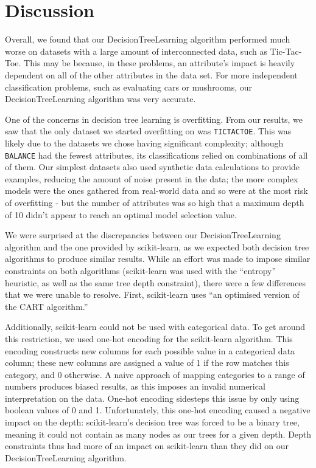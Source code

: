 \documentclass[screen, authorversion, nonacm, sigconf]{acmart}
\begin{document}
\section{Discussion}

Overall, we found that our DecisionTreeLearning algorithm performed much worse on datasets with a large amount of interconnected data, such as Tic-Tac-Toe. This may be because, in these problems, an attribute's impact is heavily dependent on all of the other attributes in the data set. For more independent classification problems, such as evaluating cars or mushrooms, our DecisionTreeLearning algorithm was very accurate.

One of the concerns in decision tree learning is overfitting. From our results, we saw that the only dataset we started overfitting on was \texttt{TICTACTOE}. This was likely due to the datasets we chose having significant complexity; although \texttt{BALANCE} had the fewest attributes, its classifications relied on combinations of all of them. Our simplest datasets also used synthetic data calculations to provide examples, reducing the amount of noise present in the data; the more complex models were the ones gathered from real-world data and so were at the most risk of overfitting - but the number of attributes was so high that a maximum depth of 10 didn't appear to reach an optimal model selection value.

We were surprised at the discrepancies between our DecisionTreeLearning algorithm and the one provided by scikit-learn, as we expected both decision tree algorithms to produce similar results. While an effort was made to impose similar constraints on both algorithms (scikit-learn was used with the ``entropy'' heuristic, as well as the same tree depth constraint), there were a few differences that we were unable to resolve. First, scikit-learn uses ``an optimised version of the CART \cite{DBLP:books/wa/BreimanFOS84} algorithm.''

Additionally, scikit-learn could not be used with categorical data. To get around this restriction, we used one-hot encoding for the scikit-learn algorithm. This encoding constructs new columns for each possible value in a categorical data column; these new columns are assigned a value of 1 if the row matches this category, and 0 otherwise. A naive approach of mapping categories to a range of numbers produces biased results, as this imposes an invalid numerical interpretation on the data. One-hot encoding sidesteps this issue by only using boolean values of 0 and 1. Unfortunately, this one-hot encoding caused a negative impact on the depth: scikit-learn's decision tree was forced to be a binary tree, meaning it could not contain as many nodes as our trees for a given depth. Depth constraints thus had more of an impact on scikit-learn than they did on our DecisionTreeLearning algorithm.
\end{document}
